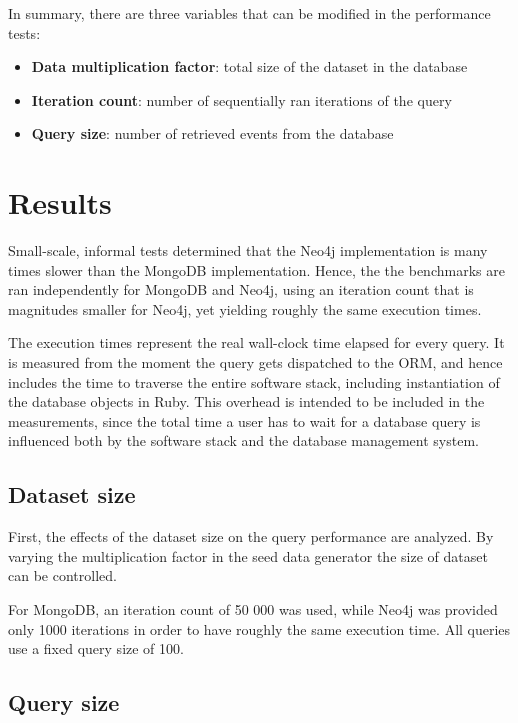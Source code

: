 In summary, there are three variables that can be modified in the performance tests:

\begin{itemize}
  \item \textbf{Data multiplication factor}: total size of the dataset in the database
  \item \textbf{Iteration count}: number of sequentially ran iterations of the query
  \item \textbf{Query size}: number of retrieved events from the database
\end{itemize}

\section{Results}
\label{sec:results}

Small-scale, informal tests determined that the Neo4j implementation is many times slower than the MongoDB implementation.
Hence, the the benchmarks are ran independently for MongoDB and Neo4j, using an iteration count that is magnitudes smaller for Neo4j, yet yielding roughly the same execution times.

The execution times represent the real wall-clock time elapsed for every query.
It is measured from the moment the query gets dispatched to the ORM, and hence includes the time to traverse the entire software stack, including instantiation of the database objects in Ruby.
This overhead is intended to be included in the measurements, since the total time a user has to wait for a database query is influenced both by the software stack and the database management system.

\subsection{Dataset size}
\label{subsec:dataset-size}

First, the effects of the dataset size on the query performance are analyzed.
By varying the multiplication factor in the seed data generator the size of dataset can be controlled.

For MongoDB, an iteration count of 50 000 was used, while Neo4j was provided only 1000 iterations in order to have roughly the same execution time.
All queries use a fixed query size of 100.



\subsection{Query size}
\label{subsec:query-size}

